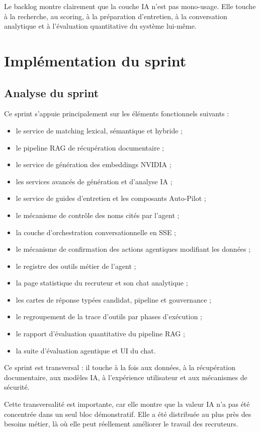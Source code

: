 Le backlog montre clairement que la couche IA n'est pas mono-usage. Elle touche à la recherche, au scoring, à la préparation d'entretien, à la conversation analytique et à l'évaluation quantitative du système lui-même.

\section{Implémentation du sprint}

\subsection{Analyse du sprint}
Ce sprint s'appuie principalement sur les éléments fonctionnels suivants :
\begin{itemize}
  \item le service de matching lexical, sémantique et hybride ;
  \item le pipeline RAG de récupération documentaire ;
  \item le service de génération des embeddings NVIDIA ;
  \item les services avancés de génération et d'analyse IA ;
  \item le service de guides d'entretien et les composants Auto-Pilot ;
  \item le mécanisme de contrôle des noms cités par l'agent ;
  \item la couche d'orchestration conversationnelle en SSE ;
  \item le mécanisme de confirmation des actions agentiques modifiant les données ;
  \item le registre des outils métier de l'agent ;
  \item la page statistique du recruteur et son chat analytique ;
  \item les cartes de réponse typées candidat, pipeline et gouvernance ;
  \item le regroupement de la trace d'outils par phases d'exécution ;
  \item le rapport d'évaluation quantitative du pipeline RAG ;
  \item la suite d'évaluation agentique et UI du chat.
\end{itemize}

Ce sprint est transversal : il touche à la fois aux données, à la récupération documentaire, aux modèles IA, à l'expérience utilisateur et aux mécanismes de sécurité.

Cette transversalité est importante, car elle montre que la valeur IA n'a pas été concentrée dans un seul bloc démonstratif. Elle a été distribuée au plus près des besoins métier, là où elle peut réellement améliorer le travail des recruteurs.

